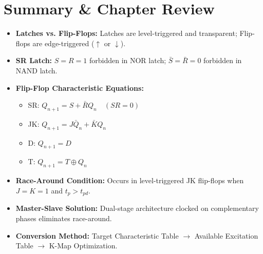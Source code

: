\section{Summary \& Chapter Review}
\begin{quickrevision}
\begin{itemize}
    \item \textbf{Latches vs. Flip-Flops:} Latches are level-triggered and transparent; Flip-flops are edge-triggered ($\uparrow$ or $\downarrow$).
    \item \textbf{SR Latch:} $S=R=1$ forbidden in NOR latch; $\bar{S}=\bar{R}=0$ forbidden in NAND latch.
    \item \textbf{Flip-Flop Characteristic Equations:}
    \begin{itemize}
        \item SR: $Q_{n+1} = S + \bar{R}Q_n \quad (SR=0)$
        \item JK: $Q_{n+1} = J\bar{Q}_n + \bar{K}Q_n$
        \item D: $Q_{n+1} = D$
        \item T: $Q_{n+1} = T \oplus Q_n$
    \end{itemize}
    \item \textbf{Race-Around Condition:} Occurs in level-triggered JK flip-flops when $J=K=1$ and $t_p > t_{pd}$.
    \item \textbf{Master-Slave Solution:} Dual-stage architecture clocked on complementary phases eliminates race-around.
    \item \textbf{Conversion Method:} Target Characteristic Table $\rightarrow$ Available Excitation Table $\rightarrow$ K-Map Optimization.
\end{itemize}
\end{quickrevision}
